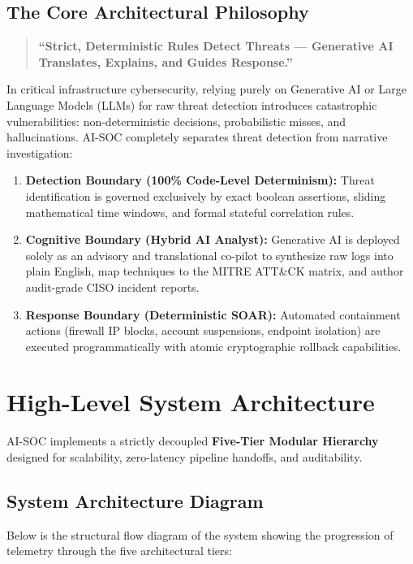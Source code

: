 \documentclass[11pt,a4paper]{article}
\begin{document}
\subsection{The Core Architectural Philosophy}
\begin{quote}
    \textbf{``Strict, Deterministic Rules Detect Threats --- Generative AI Translates, Explains, and Guides Response.''}
\end{quote}

In critical infrastructure cybersecurity, relying purely on Generative AI or Large Language Models (LLMs) for raw threat detection introduces catastrophic vulnerabilities: non-deterministic decisions, probabilistic misses, and hallucinations. AI-SOC completely separates threat detection from narrative investigation:
\begin{enumerate}
    \item \textbf{Detection Boundary (100\% Code-Level Determinism):} Threat identification is governed exclusively by exact boolean assertions, sliding mathematical time windows, and formal stateful correlation rules.
    \item \textbf{Cognitive Boundary (Hybrid AI Analyst):} Generative AI is deployed solely as an advisory and translational co-pilot to synthesize raw logs into plain English, map techniques to the MITRE ATT\&CK matrix, and author audit-grade CISO incident reports.
    \item \textbf{Response Boundary (Deterministic SOAR):} Automated containment actions (firewall IP blocks, account suspensions, endpoint isolation) are executed programmatically with atomic cryptographic rollback capabilities.
\end{enumerate}

\section{High-Level System Architecture}

AI-SOC implements a strictly decoupled \textbf{Five-Tier Modular Hierarchy} designed for scalability, zero-latency pipeline handoffs, and auditability.

\subsection{System Architecture Diagram}
Below is the structural flow diagram of the system showing the progression of telemetry through the five architectural tiers:
\end{document}
